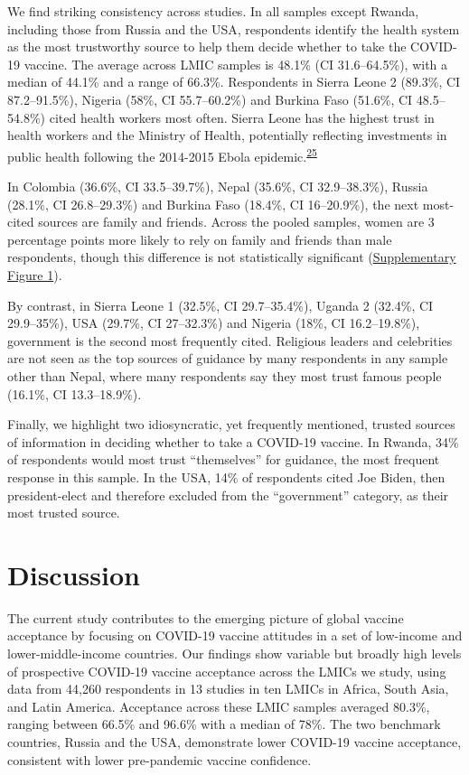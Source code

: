 \documentclass[
  12pt,
]{article}
\begin{document}
We find striking consistency across studies. In all samples except Rwanda, including those from Russia and the USA, respondents identify the health system as the most trustworthy source to help them decide whether to take the COVID-19 vaccine. The average across LMIC samples is 48.1\% (CI 31.6--64.5\%), with a median of 44.1\% and a range of 66.3\%. Respondents in Sierra Leone 2 (89.3\%, CI 87.2--91.5\%), Nigeria (58\%, CI 55.7--60.2\%) and Burkina Faso (51.6\%, CI 48.5--54.8\%) cited health workers most often. Sierra Leone has the highest trust in health workers and the Ministry of Health, potentially reflecting investments in public health following the 2014-2015 Ebola epidemic.\textsuperscript{\protect\hyperlink{ref-deserrano}{25}}

In Colombia (36.6\%, CI 33.5--39.7\%), Nepal (35.6\%, CI 32.9--38.3\%), Russia (28.1\%, CI 26.8--29.3\%) and Burkina Faso (18.4\%, CI 16--20.9\%), the next most-cited sources are family and friends. Across the pooled samples, women are 3 percentage points more likely to rely on family and friends than male respondents, though this difference is not statistically significant (\hyperref[fig:genderhist]{Supplementary Figure 1}).

By contrast, in Sierra Leone 1 (32.5\%, CI 29.7--35.4\%), Uganda 2 (32.4\%, CI 29.9--35\%), USA (29.7\%, CI 27--32.3\%) and Nigeria (18\%, CI 16.2--19.8\%), government is the second most frequently cited. Religious leaders and celebrities are not seen as the top sources of guidance by many respondents in any sample other than Nepal, where many respondents say they most trust famous people (16.1\%, CI 13.3--18.9\%).

Finally, we highlight two idiosyncratic, yet frequently mentioned, trusted sources of information in deciding whether to take a COVID-19 vaccine. In Rwanda, 34\% of respondents would most trust ``themselves'' for guidance, the most frequent response in this sample. In the USA, 14\% of respondents cited Joe Biden, then president-elect and therefore excluded from the ``government'' category, as their most trusted source.

\hypertarget{discussion}{%
\section*{Discussion}\label{discussion}}

The current study contributes to the emerging picture of global vaccine acceptance by focusing on COVID-19 vaccine attitudes in a set of low-income and lower-middle-income countries. Our findings show variable but broadly high levels of prospective COVID-19 vaccine acceptance across the LMICs we study, using data from 44,260 respondents in 13 studies in ten LMICs in Africa, South Asia, and Latin America. Acceptance across these LMIC samples averaged 80.3\%, ranging between 66.5\% and 96.6\% with a median of 78\%. The two benchmark countries, Russia and the USA, demonstrate lower COVID-19 vaccine acceptance, consistent with lower pre-pandemic vaccine confidence.
\end{document}
